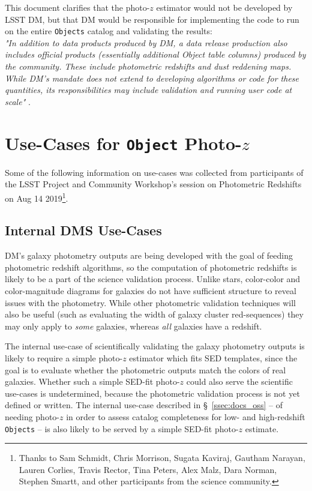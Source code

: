 \documentclass[DM,lsstdraft,toc]{lsstdoc}
\begin{document}
This document clarifies that the photo-$z$ estimator would not be developed by LSST DM, but that DM would be responsible for implementing the code to run on the entire {\tt Objects} catalog and validating the results: \\
{\it "In addition to data products produced by DM, a data release production also includes official
products (essentially additional Object table columns) produced by the community. These
include photometric redshifts and dust reddening maps. While DM's mandate does not extend
to developing algorithms or code for these quantities, its responsibilities may include validation
and running user code at scale"} .


\clearpage
\section{Use-Cases for {\tt Object} Photo-$z$} \label{sec:use}

Some of the following information on use-cases was collected from participants of the LSST Project and Community Workshop's session on Photometric Redshifts on Aug 14 2019\footnote{Thanks to Sam Schmidt, Chris Morrison, Sugata Kaviraj, Gautham Narayan, Lauren Corlies, Travis Rector, Tina Peters, Alex Malz, Dara Norman, Stephen Smartt, and other participants from the science community.}.

\subsection{Internal DMS Use-Cases}\label{ssec:use_dm}

DM's galaxy photometry outputs are being developed with the goal of feeding photometric redshift algorithms, so the computation of photometric redshifts is likely to be a part of the science validation process. 
Unlike stars, color-color and color-magnitude diagrams for galaxies do not have sufficient structure to reveal issues with the photometry.
While other photometric validation techniques will also be useful (such as evaluating the width of galaxy cluster red-sequences) they may only apply to {\it some} galaxies, whereas {\it all} galaxies have a redshift. 

The internal use-case of scientifically validating the galaxy photometry outputs is likely to require a simple photo-$z$ estimator which fits SED templates, since the goal is to evaluate whether the photometric outputs match the colors of real galaxies.
Whether such a simple SED-fit photo-$z$ could also serve the scientific use-cases is undetermined, because the photometric validation process is not yet defined or written.
The internal use-case described in \S~\ref{ssec:docs_oss} -- of needing photo-$z$ in order to assess catalog completeness for low- and high-redshift {\tt Objects} -- is also likely to be served by a simple SED-fit photo-$z$ estimate.
\end{document}
